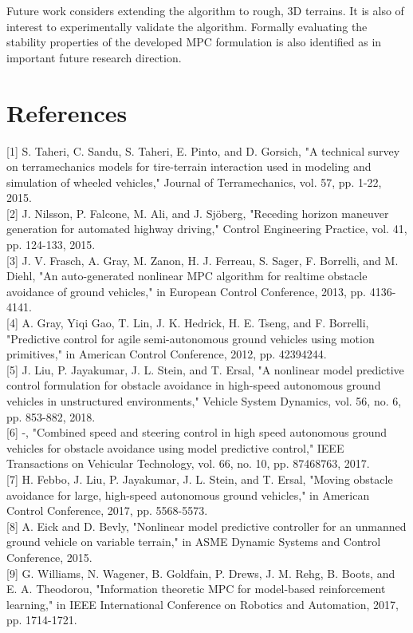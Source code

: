 \documentclass[10pt]{article}
\begin{document}
Future work considers extending the algorithm to rough, 3D terrains. It is also of interest to experimentally validate the algorithm. Formally evaluating the stability properties of the developed MPC formulation is also identified as in important future research direction.

\section*{References}
[1] S. Taheri, C. Sandu, S. Taheri, E. Pinto, and D. Gorsich, "A technical survey on terramechanics models for tire-terrain interaction used in modeling and simulation of wheeled vehicles," Journal of Terramechanics, vol. 57, pp. 1-22, 2015.\\[0pt]
[2] J. Nilsson, P. Falcone, M. Ali, and J. Sjöberg, "Receding horizon maneuver generation for automated highway driving," Control Engineering Practice, vol. 41, pp. 124-133, 2015.\\[0pt]
[3] J. V. Frasch, A. Gray, M. Zanon, H. J. Ferreau, S. Sager, F. Borrelli, and M. Diehl, "An auto-generated nonlinear MPC algorithm for realtime obstacle avoidance of ground vehicles," in European Control Conference, 2013, pp. 4136-4141.\\[0pt]
[4] A. Gray, Yiqi Gao, T. Lin, J. K. Hedrick, H. E. Tseng, and F. Borrelli, "Predictive control for agile semi-autonomous ground vehicles using motion primitives," in American Control Conference, 2012, pp. 42394244.\\[0pt]
[5] J. Liu, P. Jayakumar, J. L. Stein, and T. Ersal, "A nonlinear model predictive control formulation for obstacle avoidance in high-speed autonomous ground vehicles in unstructured environments," Vehicle System Dynamics, vol. 56, no. 6, pp. 853-882, 2018.\\[0pt]
[6] -, "Combined speed and steering control in high speed autonomous ground vehicles for obstacle avoidance using model predictive control," IEEE Transactions on Vehicular Technology, vol. 66, no. 10, pp. 87468763, 2017.\\[0pt]
[7] H. Febbo, J. Liu, P. Jayakumar, J. L. Stein, and T. Ersal, "Moving obstacle avoidance for large, high-speed autonomous ground vehicles," in American Control Conference, 2017, pp. 5568-5573.\\[0pt]
[8] A. Eick and D. Bevly, "Nonlinear model predictive controller for an unmanned ground vehicle on variable terrain," in ASME Dynamic Systems and Control Conference, 2015.\\[0pt]
[9] G. Williams, N. Wagener, B. Goldfain, P. Drews, J. M. Rehg, B. Boots, and E. A. Theodorou, "Information theoretic MPC for model-based reinforcement learning," in IEEE International Conference on Robotics and Automation, 2017, pp. 1714-1721.\\[0pt]
\end{document}
